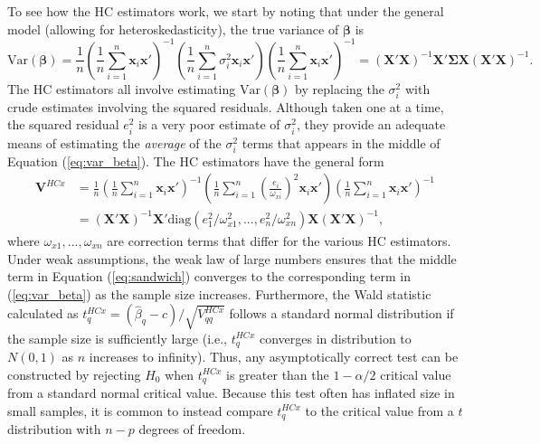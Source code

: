 \documentclass{article}\usepackage[]{graphicx}\usepackage[]{color}
\newcommand{\Var}{\text{Var}}
\newcommand{\diag}{\text{diag}}
\newcommand{\bm}{\mathbf}
\newcommand{\bs}{\boldsymbol}
\begin{document}
To see how the HC estimators work, we start by noting that under the general model (allowing for heteroskedasticity), the true variance of $\bs\beta$ is
\begin{equation}
\label{eq:var_beta}
\Var\left(\bs\beta\right) = \frac{1}{n}\left(\frac{1}{n}\sum_{i=1}^n \bm{x}_i\bm{x}'\right)^{-1}\left(\frac{1}{n}\sum_{i=1}^n \sigma_i^2 \bm{x}_i\bm{x}'\right)\left(\frac{1}{n}\sum_{i=1}^n \bm{x}_i\bm{x}'\right)^{-1} = \left(\bm{X}'\bm{X}\right)^{-1} \bm{X}'\bs\Sigma \bm{X}\left(\bm{X}'\bm{X}\right)^{-1}.
\end{equation}
The HC estimators all involve estimating $\Var\left(\bs\beta\right)$ by replacing the $\sigma_i^2$ with crude estimates involving the squared residuals. Although taken one at a time, the squared residual $e_i^2$ is a very poor estimate of $\sigma_i^2$, they provide an adequate means of estimating the \textit{average} of the $\sigma_i^2$ terms that appears in the middle of Equation (\ref{eq:var_beta}). The HC estimators have the general form 
\begin{equation}
\label{eq:sandwich}
\begin{aligned}
\bm{V}^{HCx} &= \frac{1}{n}\left(\frac{1}{n}\sum_{i=1}^n \bm{x}_i\bm{x}'\right)^{-1}\left(\frac{1}{n}\sum_{i=1}^n \left(\frac{e_i}{\omega_{xi}}\right)^2 \bm{x}_i\bm{x}'\right)\left(\frac{1}{n}\sum_{i=1}^n \bm{x}_i\bm{x}'\right)^{-1} \\
&= \left(\bm{X}'\bm{X}\right)^{-1} \bm{X}'\diag\left(e_1^2 / \omega_{x1}^2,...,e_n^2 / \omega_{xn}^2 \right) \bm{X}\left(\bm{X}'\bm{X}\right)^{-1},
\end{aligned}
\end{equation}
where $\omega_{x1},...,\omega_{xn}$ are correction terms that differ for the various HC estimators. Under weak assumptions, the weak law of large numbers ensures that the middle term in Equation (\ref{eq:sandwich}) converges to the corresponding term in (\ref{eq:var_beta}) as the sample size increases. Furthermore, the Wald statistic calculated as $t^{HCx}_q = \left(\hat\beta_q - c\right) / \sqrt{V^{HCx}_{qq}}$ follows a standard normal distribution if the sample size is sufficiently large (i.e., $t^{HCx}_q$ converges in distribution to $N(0,1)$ as $n$ increases to infinity). Thus, any asymptotically correct test can be constructed by rejecting $H_0$ when $t^{HCx}_q$ is greater than the $1 - \alpha / 2$ critical value from a standard normal critical value. Because this test often has inflated size in small samples, it is common to instead compare $t^{HCx}_q$ to the critical value from a $t$ distribution with $n - p$ degrees of freedom.
\end{document}
